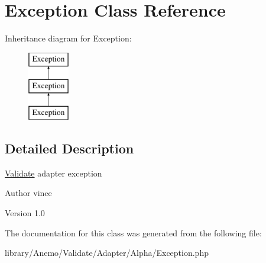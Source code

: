 \hypertarget{class_anemo_1_1_validate_1_1_adapter_1_1_alpha_1_1_exception}{
\section{Exception Class Reference}
\label{class_anemo_1_1_validate_1_1_adapter_1_1_alpha_1_1_exception}
}
Inheritance diagram for Exception:\begin{figure}[H]
\begin{center}
\leavevmode
\includegraphics[height=3.000000cm]{class_anemo_1_1_validate_1_1_adapter_1_1_alpha_1_1_exception}
\end{center}
\end{figure}


\subsection{Detailed Description}
\hyperlink{class_anemo_1_1_validate}{Validate} adapter exception \begin{DoxyAuthor}{Author}
vince 
\end{DoxyAuthor}
\begin{DoxyVersion}{Version}
1.0 
\end{DoxyVersion}


The documentation for this class was generated from the following file:\begin{DoxyCompactItemize}
\item 
library/Anemo/Validate/Adapter/Alpha/Exception.php\end{DoxyCompactItemize}
